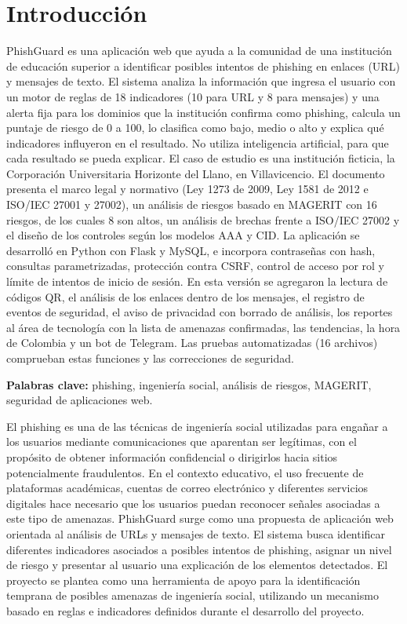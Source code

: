 \documentclass[journal,onecolumn,12pt,draftclsnofoot]{IEEEtran}
\begin{document}
\clearpage
\tableofcontents
\clearpage


\section*{Introducción}

PhishGuard es una aplicación web que ayuda a la comunidad de una institución de educación superior a identificar posibles intentos de phishing en enlaces (URL) y mensajes de texto. El sistema analiza la información que ingresa el usuario con un motor de reglas de 18 indicadores (10 para URL y 8 para mensajes) y una alerta fija para los dominios que la institución confirma como phishing, calcula un puntaje de riesgo de 0 a 100, lo clasifica como bajo, medio o alto y explica qué indicadores influyeron en el resultado. No utiliza inteligencia artificial, para que cada resultado se pueda explicar. El caso de estudio es una institución ficticia, la Corporación Universitaria Horizonte del Llano, en Villavicencio. El documento presenta el marco legal y normativo (Ley 1273 de 2009, Ley 1581 de 2012 e ISO/IEC 27001 y 27002), un análisis de riesgos basado en MAGERIT con 16 riesgos, de los cuales 8 son altos, un análisis de brechas frente a ISO/IEC 27002 y el diseño de los controles según los modelos AAA y CID. La aplicación se desarrolló en Python con Flask y MySQL, e incorpora contraseñas con hash, consultas parametrizadas, protección contra CSRF, control de acceso por rol y límite de intentos de inicio de sesión. En esta versión se agregaron la lectura de códigos QR, el análisis de los enlaces dentro de los mensajes, el registro de eventos de seguridad, el aviso de privacidad con borrado de análisis, los reportes al área de tecnología con la lista de amenazas confirmadas, las tendencias, la hora de Colombia y un bot de Telegram. Las pruebas automatizadas (16 archivos) comprueban estas funciones y las correcciones de seguridad.

\textbf{Palabras clave:} phishing, ingeniería social, análisis de riesgos, MAGERIT, seguridad de aplicaciones web.

El phishing es una de las técnicas de ingeniería social utilizadas para engañar a los usuarios mediante comunicaciones que aparentan ser legítimas, con el propósito de obtener información confidencial o dirigirlos hacia sitios potencialmente fraudulentos. En el contexto educativo, el uso frecuente de plataformas académicas, cuentas de correo electrónico y diferentes servicios digitales hace necesario que los usuarios puedan reconocer señales asociadas a este tipo de amenazas. PhishGuard surge como una propuesta de aplicación web orientada al análisis de URLs y mensajes de texto. El sistema busca identificar diferentes indicadores asociados a posibles intentos de phishing, asignar un nivel de riesgo y presentar al usuario una explicación de los elementos detectados. El proyecto se plantea como una herramienta de apoyo para la identificación temprana de posibles amenazas de ingeniería social, utilizando un mecanismo basado en reglas e indicadores definidos durante el desarrollo del proyecto.
\end{document}

